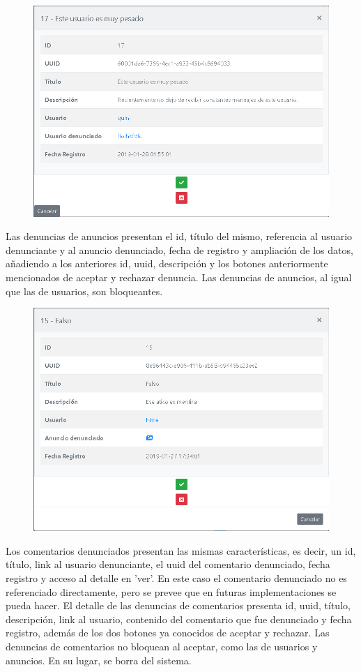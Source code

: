 \begin{figure}[h!]
\centering
\includegraphics[width=.5\textwidth]{Img/ManualUsuario/ADMIN_SHOW_REPORT_USER.png}
\end{figure}


Las denuncias de anuncios presentan el id, t\'{i}tulo del mismo, referencia al usuario denunciante y al anuncio denunciado, fecha de registro y ampliaci\'{o}n de los datos, a\~{n}adiendo a los anteriores id, uuid, descripci\'{o}n y los botones anteriormente mencionados de aceptar y rechazar denuncia. Las denuncias de anuncios, al igual que las de usuarios, son bloqueantes.


\begin{figure}[h!]
\centering
\includegraphics[width=.5\textwidth]{Img/ManualUsuario/ADMIN_SHOW_REPORT_AD.png}
\end{figure}

Los comentarios denunciados presentan las mismas caracter\'{i}sticas, es decir, un id, t\'{i}tulo, link al usuario denunciante, el uuid del comentario denunciado, fecha registro y acceso al detalle en 'ver'. En este caso el comentario denunciado no es referenciado directamente, pero se prevee que en futuras implementaciones se pueda hacer. El detalle de las denuncias de comentarios presenta id, uuid, t\'{i}tulo, descripci\'{o}n, link al usuario, contenido del comentario que fue denunciado y fecha registro, adem\'{a}s de los dos botones ya conocidos de aceptar y rechazar. Las denuncias de comentarios no bloquean al aceptar, como las de usuarios y anuncios. En su lugar, se borra del sistema.

